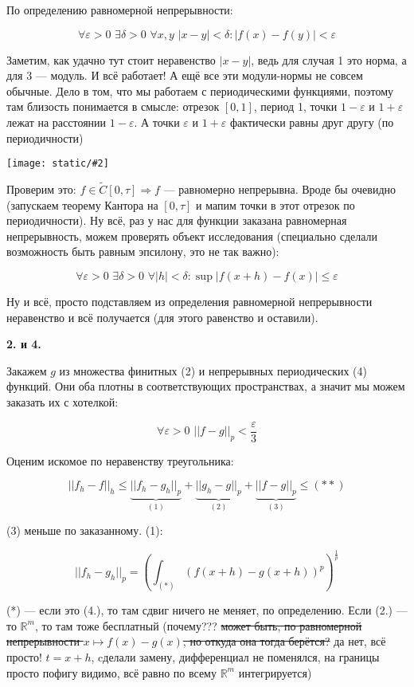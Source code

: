 \documentclass{article}
\def\dbl{\,\,}
\def\images#1#2{\begin{center}\texttt{[image: static/\#2]}\end{center}}
\begin{document}
    По определению равномерной непрерывности:

    \[\forall \varepsilon > 0 \dbl \exists \delta > 0 \dbl \forall x, y \dbl |x - y| < \delta : |f(x) - f(y)| < \varepsilon\]

    Заметим, как удачно тут стоит неравенство $|x - y|$, ведь для случая 1 это норма, а для 3 --- модуль. И всё работает! А ещё все эти модули-нормы не совсем обычные. Дело в том, что мы работаем с периодическими функциями, поэтому там близость понимается в смысле: отрезок $[0, 1]$, период 1, точки $1 - \varepsilon$ и $1 + \varepsilon$ лежат на расстоянии $1 - \varepsilon$. А точки $\varepsilon$ и $1 + \varepsilon$ фактически равны друг другу (по периодичности)

    \images{0.5}{rnepr_sdv.jpg}
    
    Проверим это: $f \in \tilde{C}[0, \tau] \Rightarrow f$ --- равномерно непрерывна. Вроде бы очевидно (запускаем теорему Кантора на $[0, \tau]$ и мапим точки в этот отрезок по периодичности). Ну всё, раз у нас для функции заказана равномерная непрерывность, можем проверять объект исследования (специально сделали возможность быть равным эпсилону, это не так важно):

    \[\forall \varepsilon > 0 \dbl \exists \delta > 0 \dbl \forall |h| < \delta: \sup |f(x + h) - f(x)| \le \varepsilon\]

    Ну и всё, просто подставляем из определения равномерной непрерывности неравенство и всё получается (для этого равенство и оставили).

    \textbf{2. и 4.}

    Закажем $g$ из множества финитных (2) и непрерывных периодических (4) функций. Они оба плотны в соответствующих пространствах, а значит мы можем заказать их с хотелкой:

    \[\forall \varepsilon > 0 \dbl ||f - g||_p < \frac{\varepsilon}{3}\]

    Оценим искомое по неравенству треугольника:

    \[||f_h - f||_h \le \underbrace{||f_h - g_h||_p}_{(1)} + \underbrace{||g_h - g||_p}_{(2)} + \underbrace{||f - g||_p}_{(3)} \le (**)\]

    (3) меньше по заказанному. (1):

    \[||f_h - g_h||_p = \left( \int_{(*)} (f(x + h) - g(x + h))^p\right)^{\frac{1}{p}}\]

    (*) --- если это (4.), то там сдвиг ничего не меняет, по определению. Если (2.) --- то $\mathbb{R}^m$, то там тоже бесплатный (почему??? \sout{может быть, по равномерной непрерывности $x \mapsto f(x) - g(x)$, но откуда она тогда берётся?} да нет, всё просто! $t = x + h$, cделали замену, дифференциал не поменялся, на границы просто пофигу видимо, всё равно по всему $\mathbb{R}^m$ интегрируется)
\end{document}
